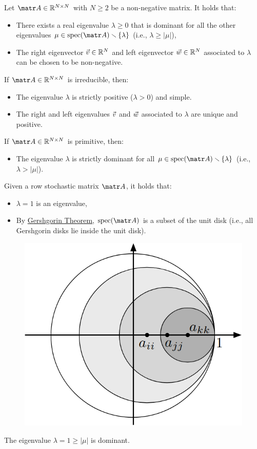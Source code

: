 \begin{theorem} \label{th:perron_frobenius} 
    Let $\A \in \R^{N \times N}$ with $N \geq 2$ be a non-negative matrix. It holds that:
    \begin{itemize}
        \item There exists a real eigenvalue $\lambda \geq 0$ that is dominant for all the other eigenvalues $\mu \in \text{spec}(\A) \smallsetminus \{\lambda\}$ (i.e., $\lambda \geq |\mu|$),
        \item The right eigenvector ${\vec{v}} \in \mathbb{R}^N$ and left eigenvector ${\vec{w}} \in \mathbb{R}^N$ associated to $\lambda$ can be chosen to be non-negative.
    \end{itemize}
    If $\A \in \R^{N \times N}$ is irreducible, then:
    \begin{itemize}
        \item The eigenvalue $\lambda$ is strictly positive ($\lambda > 0$) and simple.
        \item The right and left eigenvalues ${\vec{v}}$ and ${\vec{w}}$ associated to $\lambda$ are unique and positive.
    \end{itemize}
    If $\A \in \R^{N \times N}$ is primitive, then:
    \begin{itemize}
        \item The eigenvalue $\lambda$ is strictly dominant for all $\mu \in \text{spec}(\A) \smallsetminus \{\lambda\}$ (i.e., $\lambda > |\mu|$).
    \end{itemize}
\end{theorem}

\begin{lemma} \label{th:row_stochastic_unit_disk}
    Given a row stochastic matrix $\A$, it holds that:
    \begin{itemize}
        \item $\lambda=1$ is an eigenvalue,
        \item By \hyperref[th:gershgorin]{Gershgorin Theorem}, $\text{spec}(\A)$ is a subset of the unit disk (i.e., all Gershgorin disks lie inside the unit disk).
    \end{itemize}

    \begin{figure}[H]
        \centering
        \includegraphics[width=0.2\linewidth]{./img/gershgorin_unit.png}
    \end{figure}

    \indenttbox
    \begin{corollary}
        The eigenvalue $\lambda=1 \geq |\mu|$ is dominant.
    \end{corollary}
\end{lemma}

